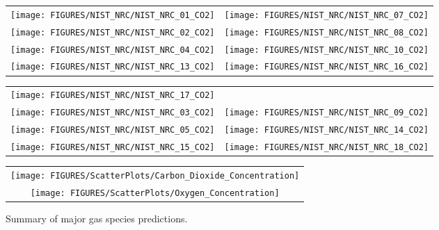 \begin{figure}[p]
\begin{tabular*}{\textwidth}{l@{\extracolsep{\fill}}r}
\texttt{[image: FIGURES/NIST\_NRC/NIST\_NRC\_01\_CO2]} &
\texttt{[image: FIGURES/NIST\_NRC/NIST\_NRC\_07\_CO2]} \\
\texttt{[image: FIGURES/NIST\_NRC/NIST\_NRC\_02\_CO2]} &
\texttt{[image: FIGURES/NIST\_NRC/NIST\_NRC\_08\_CO2]} \\
\texttt{[image: FIGURES/NIST\_NRC/NIST\_NRC\_04\_CO2]} &
\texttt{[image: FIGURES/NIST\_NRC/NIST\_NRC\_10\_CO2]} \\
\texttt{[image: FIGURES/NIST\_NRC/NIST\_NRC\_13\_CO2]} &
\texttt{[image: FIGURES/NIST\_NRC/NIST\_NRC\_16\_CO2]}
\end{tabular*}
\end{figure}

\begin{figure}[p]
\begin{tabular*}{\textwidth}{l@{\extracolsep{\fill}}r}
\texttt{[image: FIGURES/NIST\_NRC/NIST\_NRC\_17\_CO2]} &
 \\
\texttt{[image: FIGURES/NIST\_NRC/NIST\_NRC\_03\_CO2]} &
\texttt{[image: FIGURES/NIST\_NRC/NIST\_NRC\_09\_CO2]} \\
\texttt{[image: FIGURES/NIST\_NRC/NIST\_NRC\_05\_CO2]} &
\texttt{[image: FIGURES/NIST\_NRC/NIST\_NRC\_14\_CO2]} \\
\texttt{[image: FIGURES/NIST\_NRC/NIST\_NRC\_15\_CO2]} &
\texttt{[image: FIGURES/NIST\_NRC/NIST\_NRC\_18\_CO2]}
\end{tabular*}
\end{figure}


\begin{figure}[p]
\begin{center}
\begin{tabular}{c}
\texttt{[image: FIGURES/ScatterPlots/Carbon\_Dioxide\_Concentration]} \\
\texttt{[image: FIGURES/ScatterPlots/Oxygen\_Concentration]}\\
\end{tabular}
\end{center}
\caption[Summary of major gas species predictions]
{Summary of major gas species predictions.}
\end{figure}

\clearpage


